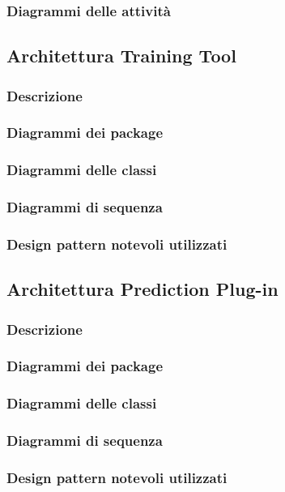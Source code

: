 \subsubsection{Diagrammi delle attività}

\subsection{Architettura Training Tool}

\subsubsection{Descrizione}

\subsubsection{Diagrammi dei package}

\subsubsection{Diagrammi delle classi}

\subsubsection{Diagrammi di sequenza}

\subsubsection{Design pattern notevoli utilizzati}

\subsection{Architettura Prediction Plug-in}

\subsubsection{Descrizione}

\subsubsection{Diagrammi dei package}

\subsubsection{Diagrammi delle classi}

\subsubsection{Diagrammi di sequenza}

\subsubsection{Design pattern notevoli utilizzati}


